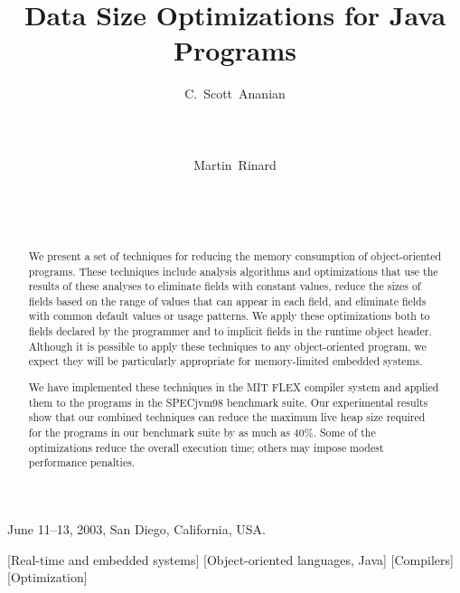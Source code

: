 \documentclass{sig-alt-full}
\begin{document}

 {June 11--13, 2003, San Diego, California, USA.}
\title{Data Size Optimizations for Java Programs}
\author{
\alignauthor C.~Scott~Ananian\\
\\
\\
\\
\alignauthor Martin~Rinard\\
\\
\\
\\
}
\maketitle
{}
%
\begin{abstract}
We present a set of techniques for reducing the memory consumption of
object-oriented programs.  These techniques 
include analysis algorithms and optimizations that use the results
of these analyses to eliminate fields with
constant values, reduce the sizes of fields based on the range
of values that can appear in each field, and 
eliminate fields with common default values
or usage patterns.
We apply these optimizations both 
to fields declared by the programmer and to implicit fields in
the runtime object header.
Although it is possible to apply these techniques to any object-oriented
program, we expect they will be particularly appropriate for
memory-limited embedded systems. 

We have implemented these techniques in the MIT FLEX compiler
system and applied them to the programs in the SPECjvm98 
benchmark suite. Our experimental results show that 
our combined techniques can reduce the maximum live heap size required
for the programs in our benchmark suite by as much as 40\%.
Some of the optimizations reduce the overall execution time;
others may impose modest performance penalties.
\end{abstract}
[Real-time and embedded systems]
[Object-oriented languages, Java]
[Compilers]
[Optimization]
%
\end{document}
